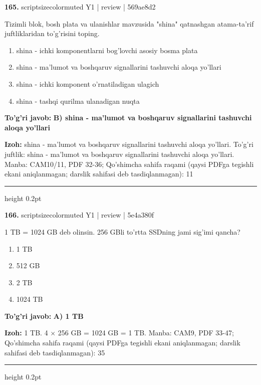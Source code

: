\documentclass[10pt,a4paper]{article}
\begin{document}
{\bfseries\sffamily\color{ink} 165.} {scriptsizecolor{muted} Y1 | review | 569ae8d2}
\par
Tizimli blok, bosh plata va ulanishlar mavzusida "shina" qatnashgan atama-ta'rif juftliklaridan to'g'risini toping.
\begin{enumerate}[label=\Alph*),leftmargin=9mm]
\item shina - ichki komponentlarni bog'lovchi asosiy bosma plata
\item shina - ma'lumot va boshqaruv signallarini tashuvchi aloqa yo'llari
\item shina - ichki komponent o'rnatiladigan ulagich
\item shina - tashqi qurilma ulanadigan nuqta
\end{enumerate}
\begin{tcolorbox}[enhanced,breakable,colback=teal!4,colframe=teal!60!black,boxrule=0.45pt,arc=1.2mm,left=2.7mm,right=2.7mm,top=1.8mm,bottom=1.8mm,before skip=2mm,after skip=2mm]
{\bfseries\sffamily\color{teal}To'g'ri javob:} \textbf{B) shina - ma'lumot va boshqaruv signallarini tashuvchi aloqa yo'llari}
\par\smallskip
{\bfseries Izoh:} shina - ma'lumot va boshqaruv signallarini tashuvchi aloqa yo'llari. To'g'ri juftlik: shina - ma'lumot va boshqaruv signallarini tashuvchi aloqa yo'llari. Manba: CAM10/11, PDF 32-36; Qo'shimcha sahifa raqami (qaysi PDFga tegishli ekani aniqlanmagan; darslik sahifasi deb tasdiqlanmagan): 11
\end{tcolorbox}
\vspace{2mm}\hrule height 0.2pt\vspace{3mm}

{\bfseries\sffamily\color{ink} 166.} {scriptsizecolor{muted} Y1 | review | 5e4a380f}
\par
1 TB = 1024 GB deb olinsin. 256 GBli to'rtta SSDning jami sig'imi qancha?
\begin{enumerate}[label=\Alph*),leftmargin=9mm]
\item 1 TB
\item 512 GB
\item 2 TB
\item 1024 TB
\end{enumerate}
\begin{tcolorbox}[enhanced,breakable,colback=teal!4,colframe=teal!60!black,boxrule=0.45pt,arc=1.2mm,left=2.7mm,right=2.7mm,top=1.8mm,bottom=1.8mm,before skip=2mm,after skip=2mm]
{\bfseries\sffamily\color{teal}To'g'ri javob:} \textbf{A) 1 TB}
\par\smallskip
{\bfseries Izoh:} 1 TB. 4 \ensuremath{\times} 256 GB = 1024 GB = 1 TB. Manba: CAM9, PDF 33-47; Qo'shimcha sahifa raqami (qaysi PDFga tegishli ekani aniqlanmagan; darslik sahifasi deb tasdiqlanmagan): 35
\end{tcolorbox}
\vspace{2mm}\hrule height 0.2pt\vspace{3mm}
\end{document}
